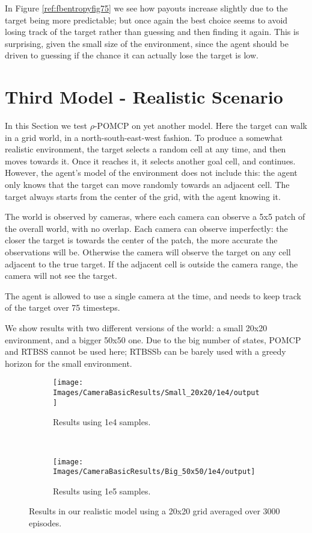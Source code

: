 In Figure \ref{ref:fbentropyfig75} we see how payouts increase slightly due to the target being more
predictable; but once again the best choice seems to avoid losing track of the target rather than
guessing and then finding it again. This is surprising, given the small size of the environment,
since the agent should be driven to guessing if the chance it can actually lose the target is low.

\section{Third Model - Realistic Scenario}

In this Section we test $\rho$-POMCP on yet another model. Here the target can walk in a grid world,
in a north-south-east-west fashion. To produce a somewhat realistic environment, the target selects
a random cell at any time, and then moves towards it. Once it reaches it, it selects another goal
cell, and continues. However, the agent's model of the environment does not include this: the agent
only knows that the target can move randomly towards an adjacent cell. The target always starts from
the center of the grid, with the agent knowing it.

The world is observed by cameras, where each camera can observe a 5x5 patch of the overall world,
with no overlap. Each camera can observe imperfectly: the closer the target is towards the center
of the patch, the more accurate the observations will be. Otherwise the camera will observe the
target on any cell adjacent to the true target. If the adjacent cell is outside the camera range,
the camera will not see the target.

The agent is allowed to use a single camera at the time, and needs to keep track of the target over
75 timesteps.

We show results with two different versions of the world: a small 20x20 environment, and a bigger
50x50 one. Due to the big number of states, POMCP and RTBSS cannot be used here; RTBSSb can be
barely used with a greedy horizon for the small environment.

\begin{figure}[ht!]
        \centering
        \begin{subfigure}[t]{0.45\textwidth}
                \texttt{[image: Images/CameraBasicResults/Small\_20x20/1e4/output]}
                \caption{Results using 1e4 samples.}
                \label{fig:cws4mb}
        \end{subfigure}%
        ~ %
        \begin{subfigure}[t]{0.45\textwidth}
                \texttt{[image: Images/CameraBasicResults/Big\_50x50/1e4/output]}
                \caption{Results using 1e5 samples.}
                \label{fig:cws5mb}
        \end{subfigure}
        \caption{Results in our realistic model using a 20x20 grid averaged over 3000 episodes.}\label{fig:cwsmb}
\end{figure}

